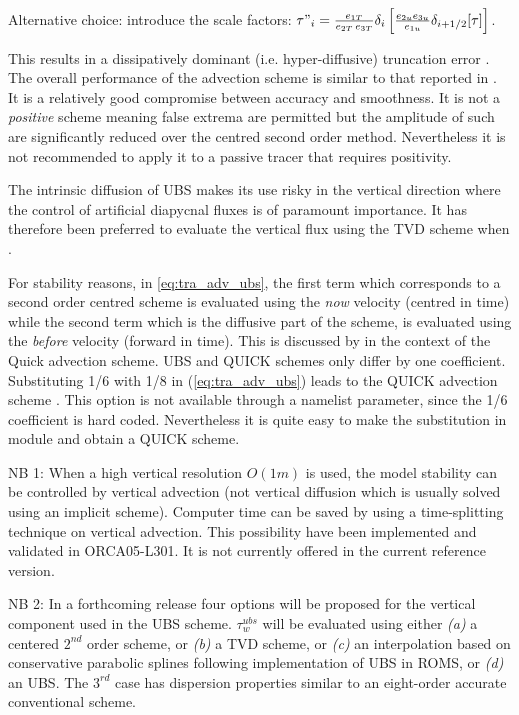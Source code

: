 \documentclass[../tex_main/NEMO_manual]{subfiles}
\begin{document}
Alternative choice: introduce the scale factors:  
$\tau "_i =\frac{e_{1T}}{e_{2T}\,e_{3T}}\delta_i \left[ \frac{e_{2u} e_{3u} }{e_{1u} }\delta_{i+1/2}[\tau] \right]$.


This results in a dissipatively dominant (i.e. hyper-diffusive) truncation error
\citep{Shchepetkin_McWilliams_OM05}.
The overall performance of the advection scheme is similar to that reported in \cite{Farrow1995}.
It is a relatively good compromise between accuracy and smoothness.
It is not a \emph{positive} scheme meaning false extrema are permitted but
the amplitude of such are significantly reduced over the centred second order method.
Nevertheless it is not recommended to apply it to a passive tracer that requires positivity. 

The intrinsic diffusion of UBS makes its use risky in the vertical direction where
the control of artificial diapycnal fluxes is of paramount importance.
It has therefore been preferred to evaluate the vertical flux using the TVD scheme when
.

For stability reasons, in \autoref{eq:tra_adv_ubs}, the first term which corresponds to
a second order centred scheme is evaluated using the \textit{now} velocity (centred in time) while
the second term which is the diffusive part of the scheme, is evaluated using the \textit{before} velocity
(forward in time).
This is discussed by \citet{Webb_al_JAOT98} in the context of the Quick advection scheme.
UBS and QUICK schemes only differ by one coefficient.
Substituting 1/6 with 1/8 in (\autoref{eq:tra_adv_ubs}) leads to the QUICK advection scheme \citep{Webb_al_JAOT98}.
This option is not available through a namelist parameter, since the 1/6 coefficient is hard coded.
Nevertheless it is quite easy to make the substitution in  module and obtain a QUICK scheme.

NB 1: When a high vertical resolution $O(1m)$ is used, the model stability can be controlled by vertical advection
(not vertical diffusion which is usually solved using an implicit scheme).
Computer time can be saved by using a time-splitting technique on vertical advection.
This possibility have been implemented and validated in ORCA05-L301.
It is not currently offered in the current reference version. 

NB 2: In a forthcoming release four options will be proposed for the vertical component used in the UBS scheme.
$\tau_w^{ubs}$ will be evaluated using either \textit{(a)} a centered $2^{nd}$ order scheme,
or \textit{(b)} a TVD scheme, or \textit{(c)} an interpolation based on conservative parabolic splines following
\citet{Shchepetkin_McWilliams_OM05} implementation of UBS in ROMS, or \textit{(d)} an UBS.
The $3^{rd}$ case has dispersion properties similar to an eight-order accurate conventional scheme.
\end{document}
